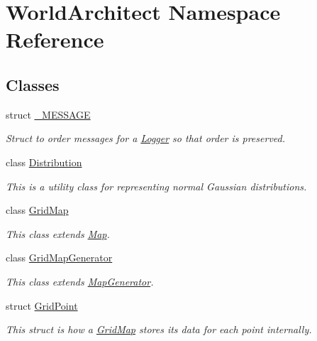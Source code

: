\hypertarget{namespace_world_architect}{}\section{World\+Architect Namespace Reference}
\label{namespace_world_architect}
\subsection*{Classes}
\begin{DoxyCompactItemize}
\item 
struct \mbox{\hyperlink{struct_world_architect_1_1___m_e_s_s_a_g_e}{\+\_\+\+M\+E\+S\+S\+A\+GE}}
\begin{DoxyCompactList}\small\item\em Struct to order messages for a \mbox{\hyperlink{class_world_architect_1_1_logger}{Logger}} so that order is preserved. \end{DoxyCompactList}\item 
class \mbox{\hyperlink{class_world_architect_1_1_distribution}{Distribution}}
\begin{DoxyCompactList}\small\item\em This is a utility class for representing normal Gaussian distributions. \end{DoxyCompactList}\item 
class \mbox{\hyperlink{class_world_architect_1_1_grid_map}{Grid\+Map}}
\begin{DoxyCompactList}\small\item\em This class extends \mbox{\hyperlink{class_world_architect_1_1_map}{Map}}. \end{DoxyCompactList}\item 
class \mbox{\hyperlink{class_world_architect_1_1_grid_map_generator}{Grid\+Map\+Generator}}
\begin{DoxyCompactList}\small\item\em This class extends \mbox{\hyperlink{class_world_architect_1_1_map_generator}{Map\+Generator}}. \end{DoxyCompactList}\item 
struct \mbox{\hyperlink{struct_world_architect_1_1_grid_point}{Grid\+Point}}
\begin{DoxyCompactList}\small\item\em This struct is how a \mbox{\hyperlink{class_world_architect_1_1_grid_map}{Grid\+Map}} stores its data for each point internally. \end{DoxyCompactList}\item 

\end{DoxyCompactItemize}
